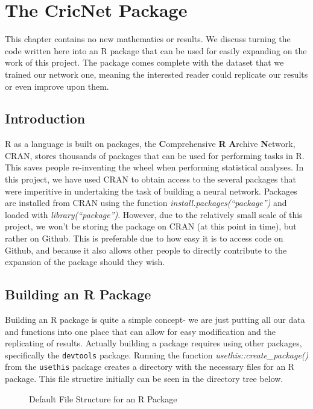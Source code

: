 \chapter{The CricNet Package}

This chapter contains no new mathematics or results. We discuss turning the code written here into an R package that can be used for easily expanding on the work of this project.
The package comes complete with the dataset that we trained our network one, meaning the interested reader could replicate our results or even improve upon them. 

\section{Introduction}

R as a language is built on packages, the \textbf{C}omprehensive \textbf{R} \textbf{A}rchive \textbf{N}etwork, CRAN, stores thousands of packages that can be used for performing tasks in R. This saves people re-inventing the wheel when performing statistical analyses. In this project, we have used CRAN to obtain 
access to the several packages that were imperitive in undertaking the task of building a neural network. 
Packages are installed from CRAN using the function \textit{install.packages(``package'')} and loaded with \textit{library(``package'')}. However, due to the relatively small scale of this project, we won't be storing the package on CRAN (at this point in time), but rather on Github. This is preferable due to how easy it is to access code on Github, and because it also allows other people to directly contribute to the expansion of the package should they wish.  

\section{Building an R Package}

Building an R package is quite a simple concept- we are just putting all our data and functions into one place that can allow for easy modification and the replicating of results. Actually building a package requires using other packages, specifically the \verb|devtools| package. Running the function \textit{usethis::create\_package()} from the \verb|usethis| package creates a directory with the necessary files for an R package. This file structire initially can be seen in the directory tree below. \\

\begin{figure}[h]
\caption{Default File Structure for an R Package}




\end{figure}

